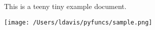 \documentclass[varwidth,border=3mm]{standalone} %
\begin{document}
  \pagecolor{black!20} %
  This is a teeny tiny example document.
  \begin{center}
    \texttt{[image: /Users/ldavis/pyfuncs/sample.png]}
  \end{center}
\end{document}
